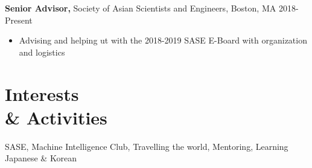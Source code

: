 \documentclass[margin]{res}
\begin{document}
\begin{resume}
\begin{itemize}
		 \end{itemize}
            {\bf Senior Advisor,} Society of Asian Scientists and Engineers, Boston, MA \hfill 2018-Present
            \begin{itemize} \itemsep -0.5pt
                \item Advising and helping ut with the 2018-2019 SASE E-Board with organization and logistics 
            \end{itemize}

 
\section{Interests \\ \& Activities}
SASE, Machine Intelligence Club, Travelling the world, Mentoring, Learning Japanese \& Korean
\end{resume} 
\end{document}
